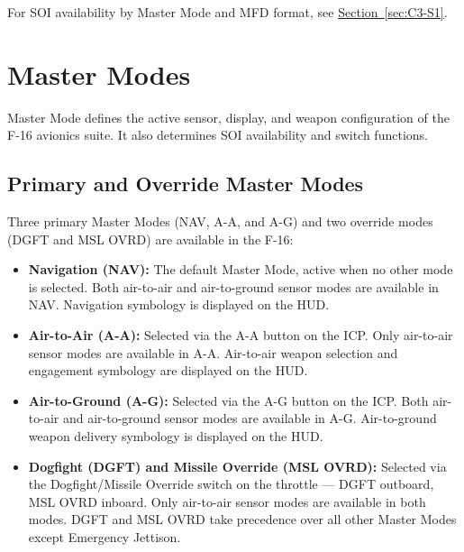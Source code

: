 \documentclass[11pt, a4paper, twoside]{report}
\newcommand{\secref}[1]{\hyperref[#1]{Section~\ref*{#1}}}
\begin{document}
For SOI availability by Master Mode and MFD format, see \secref{sec:C3-S1}.

\section{Master Modes}
\label{sec:C2-S2}

Master Mode defines the active sensor, display, and weapon configuration of the F-16 avionics suite. It also determines SOI availability and switch functions.

\subsection{Primary and Override Master Modes}
\label{sec:C2-S2-S1}

Three primary Master Modes (NAV, A-A, and A-G) and two override modes (DGFT and MSL OVRD) are available in the F-16:

\begin{itemize}

	\item \textbf{Navigation (NAV):} The default Master Mode, active when no other mode is selected. Both air-to-air and air-to-ground sensor modes are available in NAV. Navigation symbology is displayed on the HUD.
    \item \textbf{Air-to-Air (A-A):} Selected via the A-A button on the ICP. Only air-to-air sensor modes are available in A-A. Air-to-air weapon selection and engagement symbology are displayed on the HUD.
    \item \textbf{Air-to-Ground (A-G):} Selected via the A-G button on the ICP. Both air-to-air and air-to-ground sensor modes are available in A-G. Air-to-ground weapon delivery symbology is displayed on the HUD.
    \item \textbf{Dogfight (DGFT) and Missile Override (MSL OVRD):} Selected via the Dogfight/Missile Override switch on the throttle — DGFT outboard, MSL OVRD inboard. Only air-to-air sensor modes are available in both modes. DGFT and MSL OVRD take precedence over all other Master Modes except Emergency Jettison.

\end{itemize}
\end{document}
